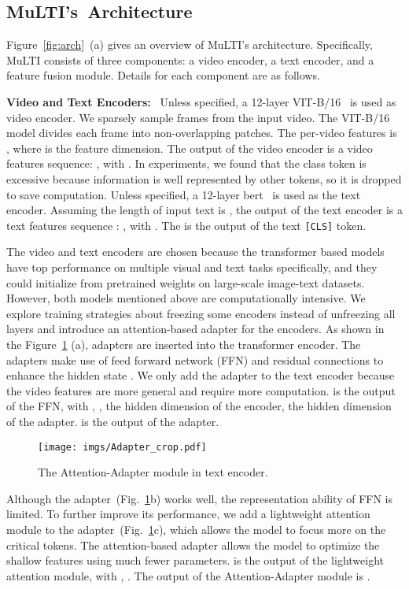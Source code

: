 \documentclass[10pt,twocolumn,letterpaper]{article}
\begin{document}
\vspace{-1ex}
\subsection{\textbf{MuLTI's}~Architecture}\label{sec:method-arch}
\vspace{-0.5ex}
Figure~\ref{fig:arch}~(a) gives an overview of MuLTI's architecture.
Specifically, MuLTI consists of three components: a video encoder, a text encoder, and a feature fusion module. Details for each component are as follows.

\textbf{Video and Text Encoders:}~
Unless specified, a 12-layer VIT-B/16~\cite{Radford2021LearningTV} is used as video encoder. 
We sparsely sample  frames from the input video. The VIT-B/16 model divides each frame into  non-overlapping patches. 
The per-video features is , where  is the feature dimension.
The output of the video encoder is a video features sequence: , with . 
In experiments, we found that the class token is excessive because information is well represented by other tokens, so it is dropped to save computation.
Unless specified, a 12-layer bert~\cite{Devlin2018Bert} is used as the text encoder. Assuming the length of input text is , the output of the text encoder is a text features sequence : , with . The  is the output of the text \texttt{[CLS]} token. 


The video and text encoders are chosen because the transformer based models have top performance on multiple visual and text tasks specifically, and they could initialize from pretrained weights on large-scale image-text datasets. However, both models mentioned above are computationally intensive. 
We explore training strategies about freezing some encoders instead of unfreezing all layers and introduce an attention-based adapter for the encoders. 
As shown in the Figure~\ref{fig:adapter} (a), adapters \cite{Houlsby2019ParameterEfficientTL} are inserted into the transformer encoder. The adapters make use of feed forward network (FFN) and residual connections to enhance the hidden state . 
We only add the adapter to the text encoder because the video features are more general and require more computation. 
 is the output of the FFN, with , ,  the hidden dimension of the encoder,  the hidden dimension of the adapter.  is the output of the adapter.
\begin{figure}[ht]
\vspace{-2ex}
\centering
\texttt{[image: imgs/Adapter\_crop.pdf]}
\vspace{-1ex}
\caption{
The Attention-Adapter module in text encoder. 
}
\label{fig:adapter}
\vspace{-1ex}
\end{figure} 
Although the adapter~(Fig.~\ref{fig:adapter}b) works well, the representation ability of FFN is limited. To further improve its performance, we add a lightweight attention module to the adapter~(Fig.~\ref{fig:adapter}c), which allows the model to focus more on the critical tokens. 
The attention-based adapter allows the model to optimize the shallow features using much fewer parameters.  is the output of the lightweight attention module, with , . The output of the Attention-Adapter module is . 
\end{document}
